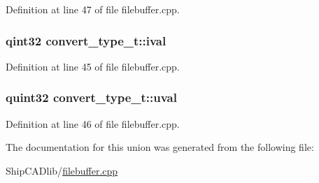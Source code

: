 Definition at line 47 of file filebuffer.\-cpp.

\hypertarget{unionconvert__type__t_a23001696f165130f03d305c2bc1442eb}{
\subsubsection[{ival}]{\setlength{\rightskip}{0pt plus 5cm}qint32 convert\-\_\-type\-\_\-t\-::ival}}\label{unionconvert__type__t_a23001696f165130f03d305c2bc1442eb}


Definition at line 45 of file filebuffer.\-cpp.

\hypertarget{unionconvert__type__t_a589a9a481a1889a166442e985519ac7c}{
\subsubsection[{uval}]{\setlength{\rightskip}{0pt plus 5cm}quint32 convert\-\_\-type\-\_\-t\-::uval}}\label{unionconvert__type__t_a589a9a481a1889a166442e985519ac7c}


Definition at line 46 of file filebuffer.\-cpp.



The documentation for this union was generated from the following file\-:\begin{DoxyCompactItemize}
\item 
Ship\-C\-A\-Dlib/\hyperlink{filebuffer_8cpp}{filebuffer.\-cpp}\end{DoxyCompactItemize}
